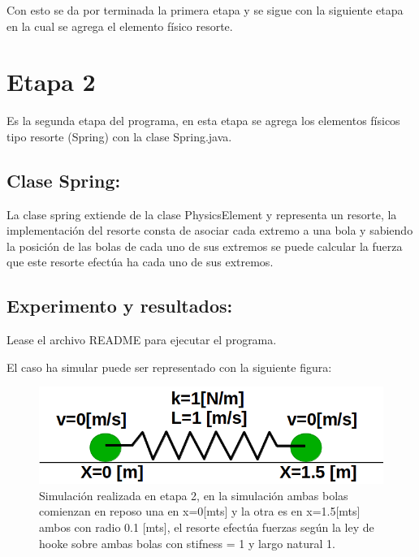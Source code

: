\documentclass[a4paper,10pt]{article}
\begin{document}
Con esto se da por terminada la primera etapa y se sigue con la siguiente etapa en la cual se agrega el elemento físico resorte.\newline

\section{Etapa 2}

Es la segunda etapa del programa, en esta etapa se agrega los elementos físicos tipo resorte (Spring) con la clase Spring.java.

\subsection{Clase Spring:}

La clase spring extiende de la clase PhysicsElement y representa un resorte, la implementación del resorte consta de asociar cada extremo a 
una bola y sabiendo la posición de las bolas de cada uno de sus extremos se puede calcular la fuerza que este resorte efectúa ha cada
uno de sus extremos.\newline

\subsection{Experimento y resultados:}

Lease el archivo README para ejecutar el programa.\newline

El caso ha simular puede ser representado con la siguiente figura:

\begin{figure}[H]
 \centering
 \includegraphics[scale=0.3]{./FigureB.png}
 \caption{Simulación realizada en etapa 2, en la simulación ambas bolas comienzan en reposo una en x=0[mts] y la otra es en x=1.5[mts] ambos con radio 0.1 [mts],
 el resorte efectúa fuerzas según la ley de hooke sobre ambas bolas con stifness = 1 y largo natural 1.}
  \label{etapa2.1}
\end{figure}
\end{document}
